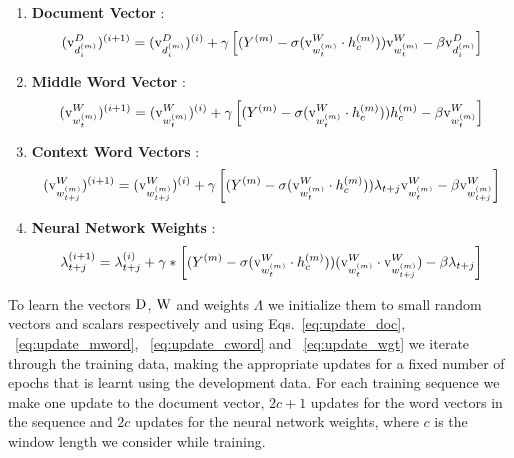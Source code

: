 \begin{enumerate}
\item 
\textbf{Document Vector} : 
\begin{equation}
\label{eq:update_doc}
(\mathrm{v}^{D}_{d^{(m)}_{i}})^{(i+1)} = (\mathrm{v}^{D}_{d^{(m)}_{i}})^{(i)} + \gamma \left[ (Y^{(m)} - \sigma(\mathrm{v}^{W}_{w^{(m)}_{t}} \cdot h^{(m)}_{c}))\mathrm{v}^{W}_{w^{(m)}_{t}} - \beta\mathrm{v}^{D}_{d^{(m)}_{i}} \right]
\end{equation}
\item 
\textbf{Middle Word Vector} : 
\begin{equation}
\label{eq:update_mword}
(\mathrm{v}^{W}_{w^{(m)}_{t}})^{(i+1)} = (\mathrm{v}^{W}_{w^{(m)}_{t}})^{(i)} + \gamma \left[ (Y^{(m)} - \sigma(\mathrm{v}^{W}_{w^{(m)}_{t}} \cdot h^{(m)}_{c})) h^{(m)}_{c} - \beta\mathrm{v}^{W}_{w^{(m)}_{t}} \right]
\end{equation}
\item 
\textbf{Context Word Vectors} : 
\begin{equation}
\label{eq:update_cword}
(\mathrm{v}^{W}_{w^{(m)}_{t+j}})^{(i+1)} = (\mathrm{v}^{W}_{w^{(m)}_{t+j}})^{(i)} + \gamma \left[(Y^{(m)} - \sigma(\mathrm{v}^{W}_{w^{(m)}_{t}} \cdot h^{(m)}_{c}))\lambda_{t+j} \mathrm{v}^{W}_{w^{(m)}_{t}} - \beta\mathrm{v}^{W}_{w^{(m)}_{t+j}} \right]
\end{equation}
\item 
\textbf{Neural Network Weights} : 
\begin{equation}
\label{eq:update_wgt}
\lambda_{t+j}^{(i+1)} = \lambda_{t+j}^{(i)} + \gamma* \left[ (Y^{(m)} - \sigma(\mathrm{v}^{W}_{w^{(m)}_{t}} \cdot h^{(m)}_{c}))(\mathrm{v}^{W}_{w^{(m)}_{t}} \cdot \mathrm{v}^{W}_{w^{(m)}_{t+j}}) -\beta\lambda_{t+j} \right]
\end{equation}
\end{enumerate}
To learn the vectors $\mathrm{D}$, $\mathrm{W}$ and weights $\Lambda$ we initialize them to small random vectors and scalars respectively and using Eqs.~\ref{eq:update_doc}, ~\ref{eq:update_mword}, ~\ref{eq:update_cword} and ~\ref{eq:update_wgt} we iterate through the training data, making the appropriate updates for a fixed number of epochs that is learnt using the development data. For each training sequence we make one update to the document vector, $2c+1$ updates for the word vectors in the sequence and $2c$ updates for the neural network weights, where $c$ is the window length we consider while training.

